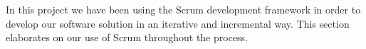 In this project we have been using the Scrum development framework in order to develop our software solution in an iterative and incremental way. This section elaborates on our use of Scrum throughout the process.